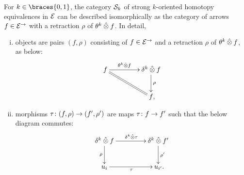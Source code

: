 \documentclass[reqno,10pt,a4paper,oneside,draft]{amsart}
\begin{document}
\begin{lemma} \label{strong-h-equiv-as-section}
For $k \in \braces{0, 1}$, the category $\cal{S}_k$ of strong $k$-oriented homotopy equivalences in $\catE$ can be described isomorphically as the category of arrows $f \in \catE^{\to}$ with a retraction $\rho$ of $\thetak \hatotimes f$.
In detail,
\begin{enumerate}[(i)]
\item objects are pairs $(f, \rho)$ consisting of $f \in \catE^\to$ and a retraction $\rho$ of $\thetak \hatotimes f$, as below:
\[
\xymatrix@C+2em{
  f
  \ar[r]^-{\thetak \hatotimes f}
  \ar@{=}[dr]
&
  \kcyl \hatotimes f \ar[d]^{\rho}
\\&
  f
\rlap{,}}
\]
\item morphisms $\tau \co (f, \rho) \to (f', \rho')$ are maps $\tau \co f \to f'$ such that the below diagram commutes:
\[
\xymatrix@C+2em{
  \kcyl \hatotimes f
  \ar[d]_-{\rho}
  \ar[r]^{\kcyl \hatotimes \tau}
&
 \kcyl \hatotimes f'
  \ar[d]^-{\rho'}
\\
  u_i
  \ar[r]_{\tau}
&
  u_{i'}
\rlap{.}}
\]
\end{enumerate}
\end{lemma}
\end{document}
